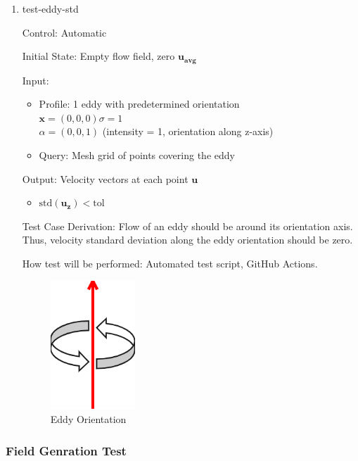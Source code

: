 \documentclass[12pt, titlepage]{article}
\begin{document}
\begin{enumerate}
  \newpage
  \item{test-eddy-std\\}

  Control: Automatic
            
  Initial State: Empty flow field, zero $\mathbf{u_{avg}}$
            
  Input:
  \begin{itemize}
    \item Profile: 1 eddy with predetermined orientation\\
    $\mathbf{x}=(0,0,0)$\tab$\sigma=1$\\
    $\alpha=(0,0,1)$ (intensity = 1, orientation along z-axis)
    \item Query: Mesh grid of points covering the eddy
  \end{itemize}
  Output: Velocity vectors at each point $\mathbf{u}$
  \begin{itemize}
    \item $\text{std}(\mathbf{u_z}) < \text{tol}$
  \end{itemize}

  Test Case Derivation: Flow of an eddy should be around its orientation axis. Thus, velocity standard deviation along the eddy orientation should be zero.
            
  How test will be performed: Automated test script, GitHub Actions.

  \begin{figure}[h!]
    \begin{center}
    \includegraphics[width=0.3\textwidth]{eddy-orient.png}
    \caption{Eddy Orientation}
    \label{Fig_EddyOrient} 
    \end{center}
  \end{figure}

\end{enumerate}

\newpage
\subsubsection{Field Genration Test} \label{FieldGenTest}
\end{document}

